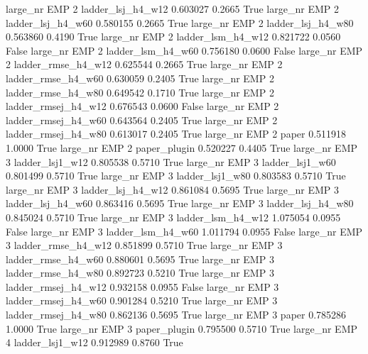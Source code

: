   large_nr      EMP                 2   ladder_lsj_h4_w12   0.603027      0.2665    True
  large_nr      EMP                 2   ladder_lsj_h4_w60   0.580155      0.2665    True
  large_nr      EMP                 2   ladder_lsj_h4_w80   0.563860      0.4190    True
  large_nr      EMP                 2   ladder_lsm_h4_w12   0.821722      0.0560   False
  large_nr      EMP                 2   ladder_lsm_h4_w60   0.756180      0.0600   False
  large_nr      EMP                 2  ladder_rmse_h4_w12   0.625544      0.2665    True
  large_nr      EMP                 2  ladder_rmse_h4_w60   0.630059      0.2405    True
  large_nr      EMP                 2  ladder_rmse_h4_w80   0.649542      0.1710    True
  large_nr      EMP                 2 ladder_rmsej_h4_w12   0.676543      0.0600   False
  large_nr      EMP                 2 ladder_rmsej_h4_w60   0.643564      0.2405    True
  large_nr      EMP                 2 ladder_rmsej_h4_w80   0.613017      0.2405    True
  large_nr      EMP                 2               paper   0.511918      1.0000    True
  large_nr      EMP                 2        paper_plugin   0.520227      0.4405    True
  large_nr      EMP                 3     ladder_lsj1_w12   0.805538      0.5710    True
  large_nr      EMP                 3     ladder_lsj1_w60   0.801499      0.5710    True
  large_nr      EMP                 3     ladder_lsj1_w80   0.803583      0.5710    True
  large_nr      EMP                 3   ladder_lsj_h4_w12   0.861084      0.5695    True
  large_nr      EMP                 3   ladder_lsj_h4_w60   0.863416      0.5695    True
  large_nr      EMP                 3   ladder_lsj_h4_w80   0.845024      0.5710    True
  large_nr      EMP                 3   ladder_lsm_h4_w12   1.075054      0.0955   False
  large_nr      EMP                 3   ladder_lsm_h4_w60   1.011794      0.0955   False
  large_nr      EMP                 3  ladder_rmse_h4_w12   0.851899      0.5710    True
  large_nr      EMP                 3  ladder_rmse_h4_w60   0.880601      0.5695    True
  large_nr      EMP                 3  ladder_rmse_h4_w80   0.892723      0.5210    True
  large_nr      EMP                 3 ladder_rmsej_h4_w12   0.932158      0.0955   False
  large_nr      EMP                 3 ladder_rmsej_h4_w60   0.901284      0.5210    True
  large_nr      EMP                 3 ladder_rmsej_h4_w80   0.862136      0.5695    True
  large_nr      EMP                 3               paper   0.785286      1.0000    True
  large_nr      EMP                 3        paper_plugin   0.795500      0.5710    True
  large_nr      EMP                 4     ladder_lsj1_w12   0.912989      0.8760    True

